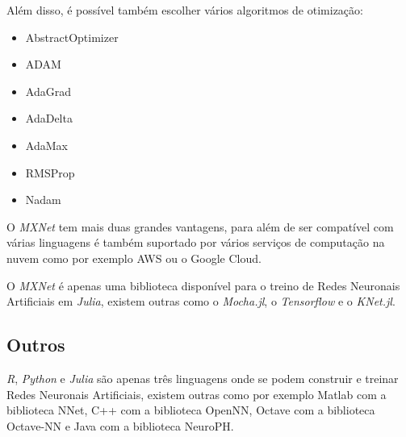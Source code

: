 Além disso, é possível também escolher vários algoritmos de otimização:
\begin{itemize}
    \item AbstractOptimizer
    \item ADAM
    \item AdaGrad
    \item AdaDelta
    \item AdaMax
    \item RMSProp
    \item Nadam
\end{itemize}

O \textit{MXNet} tem mais duas grandes vantagens, para além de ser compatível com várias linguagens é também suportado por vários serviços de computação na nuvem como por exemplo AWS ou o Google Cloud.

\vspace{2mm} O \textit{MXNet} é apenas uma biblioteca disponível para o treino de Redes Neuronais Artificiais em \textit{Julia}, existem outras como o \textit{Mocha.jl}, o \textit{Tensorflow} e o \textit{KNet.jl}.

\subsection*{Outros}

\textit{R}, \textit{Python} e \textit{Julia} são apenas três linguagens onde se podem construir e treinar Redes Neuronais Artificiais, existem outras como por exemplo Matlab com a biblioteca NNet, C++ com a biblioteca OpenNN, Octave com a biblioteca Octave-NN e Java com a biblioteca NeuroPH.